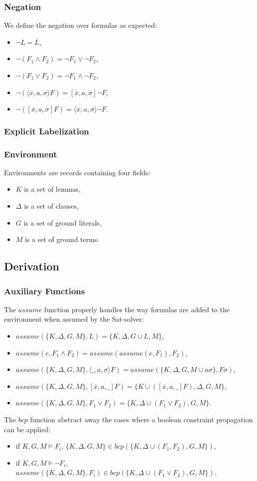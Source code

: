 \documentclass[a4paper,11pt]{article}
\newcommand{\A}{\mathit{assume}}
\newcommand{\B}{\mathit{bcp}}
\begin{document}
\subsubsection{Negation}
We define the negation over formulas as expected:
\begin{itemize}
 \item $\neg L=\overline L$,
 \item $\neg(F_1\wedge F_2)=\neg F_1\vee\neg F_2$,
 \item $\neg(F_1\vee F_2)=\neg F_1\wedge\neg F_2$,
 \item $\neg(\langle\overline x,a,\sigma\rangle F)=[\overline x,a,\sigma]\neg F$,
 \item $\neg([\overline x,a,\sigma]F)=\langle\overline x,a,\sigma\rangle\neg F$.
\end{itemize}
\subsubsection{Explicit Labelization}
\subsubsection{Environment}
Environments are records containing four fields:
\begin{itemize}
 \item $K$ is a set of lemmas,
 \item $\Delta$ is a set of clauses,
 \item $G$ is a set of ground literals,
 \item $M$ is a set of ground terms.
\end{itemize}
\subsection{Derivation}
\subsubsection{Auxiliary Functions}
The $\A$ function properly handles the way formulas are added to the environment when assumed
by the Sat-solver:
\begin{itemize}
 \item $\A(\{K,\Delta,G,M\},L)=\{K,\Delta,G\cup L,M\}$,
 \item $\A(e,F_1\wedge F_2)=\A(\A(e,F_1),F_2)$,
 \item $\A(\{K,\Delta,G,M\},\langle\_,a,\sigma\rangle F)=
\A(\{K,\Delta,G,M\cup a\sigma\},F\sigma)$,
 \item $\A(\{K,\Delta,G,M\},[\overline x,a,\_]F)=\{K\cup([\overline x,a,\_]F),\Delta,G,M\}$,
 \item $\A(\{K,\Delta,G,M\},F_1\vee F_2)=\{K,\Delta\cup(F_1\vee F_2),G,M\}$.
\end{itemize}
The $\B$ function abstract away the cases where a boolean constraint propagation can be applied:
\begin{itemize}
 \item if $K,G,M\vDash F_i$, $\{K,\Delta,G,M\}\in\B(\{K,\Delta\cup(F_1,F_2),G,M\})$,
 \item if $K,G,M\vDash\neg F_i$, $\A(\{K,\Delta,G,M\},F_i)\in
\B(\{K,\Delta\cup(F_1\vee F_2),G,M\})$.
\end{itemize}
\end{document}
